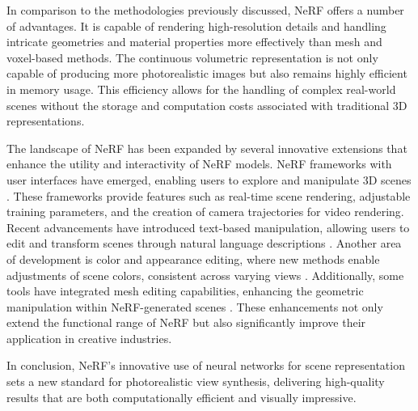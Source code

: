 In comparison to the methodologies previously discussed, NeRF offers a number of advantages.
It is capable of rendering high-resolution details and handling intricate geometries and material properties more effectively than mesh and voxel-based methods.
The continuous volumetric representation is not only capable of producing more photorealistic images but also remains highly efficient in memory usage.
This efficiency allows for the handling of complex real-world scenes without the storage and computation costs associated with traditional 3D representations.

The landscape of NeRF has been expanded by several innovative extensions that enhance the utility and interactivity of NeRF models.
NeRF frameworks with user interfaces have emerged, enabling users to explore and manipulate 3D scenes \cite{muller_instant_2022,tancik_nerfstudio_2023}.
These frameworks provide features such as real-time scene rendering, adjustable training parameters, and the creation of camera trajectories for video rendering.
Recent advancements have introduced text-based manipulation, allowing users to edit and transform scenes through natural language descriptions \cite{bao_sine_2023,bar-tal_text2live_2022,haque_instruct-nerf2nerf_2023,jan-niklas_dihlmann_signerf_2024,wang_clip-nerf_2022}.
Another area of development is color and appearance editing, where new methods enable adjustments of scene colors, consistent across varying views \cite{wu_palettenerf_2022}.
Additionally, some tools have integrated mesh editing capabilities, enhancing the geometric manipulation within NeRF-generated scenes \cite{yuan_nerf-editing_2022}.
These enhancements not only extend the functional range of NeRF but also significantly improve their application in creative industries.

In conclusion, NeRF's innovative use of neural networks for scene representation sets a new standard for photorealistic view synthesis, delivering high-quality results that are both computationally efficient and visually impressive.
